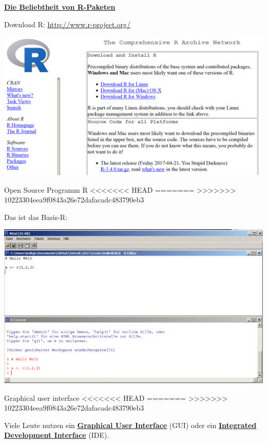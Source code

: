\documentclass[ignorenonframetext,]{beamer}
\begin{document}
\begin{frame}{\href{https://gallery.shinyapps.io/cran-gauge/}{\textbf{Die
Beliebtheit von R-Paketen}}}
\begin{frame}{Download R:}
\url{http://www.r-project.org/}

\includegraphics{figure/CRAN1picture.PNG}

\end{frame}

\begin{frame}{Open Source Programm R}
<<<<<<< HEAD
=======
\protect\hypertarget{open-source-programm-r}{}
>>>>>>> 10223304eea9f0843a26e72dafacadc483790eb3

\begin{block}{Das ist das Basis-R:}

\includegraphics{figure/BasisR.PNG}

\end{block}

\end{frame}

\begin{frame}{Graphical user interface}
<<<<<<< HEAD
=======
\protect\hypertarget{graphical-user-interface}{}
>>>>>>> 10223304eea9f0843a26e72dafacadc483790eb3

Viele Leute nutzen ein
\href{https://en.wikipedia.org/wiki/Graphical_user_interface}{\textbf{Graphical
User Interface}} (GUI) oder ein
\href{https://en.wikipedia.org/wiki/Integrated_development_environment}{\textbf{Integrated
Development Interface}} (IDE).


\end{frame}
\end{frame}
\end{document}
